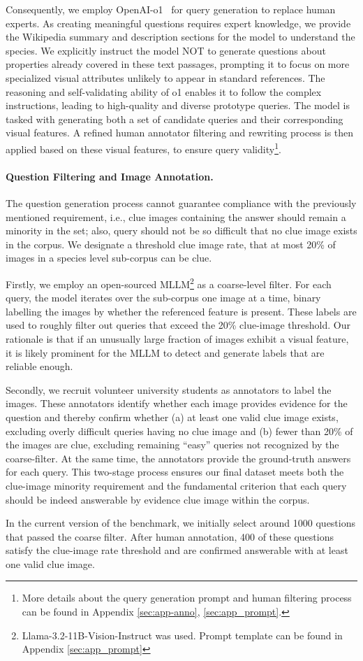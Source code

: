 Consequently, we employ OpenAI-o1~\citep{o1} for query generation to replace human experts. As creating meaningful questions requires expert knowledge, we provide the Wikipedia summary and description sections for the model to understand the species. We explicitly instruct the model NOT to generate questions about properties already covered in these text passages, prompting it to focus on more specialized visual attributes unlikely to appear in standard references. The reasoning and self-validating ability of o1 enables it to follow the complex instructions, leading to high-quality and diverse prototype queries. The model is tasked with generating both a set of candidate queries and their corresponding visual features. A refined human annotator filtering and rewriting process is then applied based on these visual features, to ensure query validity\footnote{More details about the query generation prompt and human filtering process can be found in Appendix \ref{sec:app-anno}, \ref{sec:app_prompt}.}.



\paragraph{Question Filtering and Image Annotation.}
The question generation process cannot guarantee compliance with the previously mentioned requirement, i.e., clue images containing the answer should remain a minority in the set; also, query should not be so difficult that no clue image exists in the corpus. We designate a threshold clue image rate, that at most 20\% of images in a species level sub-corpus can be clue.

Firstly, we employ an open-sourced MLLM\footnote{Llama-3.2-11B-Vision-Instruct was used. Prompt template can be found in Appendix \ref{sec:app_prompt}} as a coarse-level filter. For each query, the model iterates over the sub-corpus one image at a time, binary labelling the images by whether the referenced feature is present. These labels are used to roughly filter out queries that exceed the 20\% clue-image threshold. Our rationale is that if an unusually large fraction of images exhibit a visual feature, it is likely prominent for the MLLM to detect and generate labels that are reliable enough.

Secondly, we recruit volunteer university students as annotators to label the images. These annotators identify whether each image provides evidence for the question and thereby confirm whether (a) at least one valid clue image exists, excluding overly difficult queries having no clue image and (b) fewer than 20\% of the images are clue, excluding remaining “easy” queries not recognized by the coarse-filter. At the same time, the annotators provide the ground-truth answers for each query. This two-stage process ensures our final dataset meets both the clue-image minority requirement and the fundamental criterion that each query should be indeed answerable by evidence clue image within the corpus.

In the current version of the benchmark, we initially select around 1000 questions that passed the coarse filter. After human annotation, 400 of these questions satisfy the clue-image rate threshold and are confirmed answerable with at least one valid clue image.
